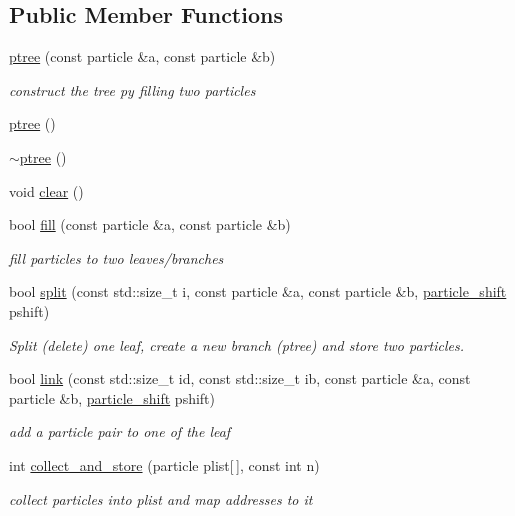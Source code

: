 \subsection*{Public Member Functions}
\begin{DoxyCompactItemize}
\item 
\hyperlink{classptree_a128cebcb837edbd16dd6dd9c7784ddd9}{ptree} (const particle \&a, const particle \&b)
\begin{DoxyCompactList}\small\item\em construct the tree py filling two particles \end{DoxyCompactList}\item 
\hyperlink{classptree_afcae2407c3b390bf0d7579951bd96961}{ptree} ()
\item 
\hyperlink{classptree_a7f4dd129764d06800dbadb91ed88a62c}{$\sim$ptree} ()
\item 
void \hyperlink{classptree_aa7b4caa59ef84eca62433a9621dcfb1b}{clear} ()
\item 
bool \hyperlink{classptree_a296d5895fbf14f2bb3af6ebf2fa52164}{fill} (const particle \&a, const particle \&b)
\begin{DoxyCompactList}\small\item\em fill particles to two leaves/branches \end{DoxyCompactList}\item 
bool \hyperlink{classptree_ae4c20eddf5cfcf45e5f809567c967bf9}{split} (const std\+::size\+\_\+t i, const particle \&a, const particle \&b, \hyperlink{classptree_abbd858cc881219618a3ac42f3df11cc6}{particle\+\_\+shift} pshift)
\begin{DoxyCompactList}\small\item\em Split (delete) one leaf, create a new branch (ptree) and store two particles. \end{DoxyCompactList}\item 
bool \hyperlink{classptree_a84643c9c87f4ed74ec06542e22c8bee7}{link} (const std\+::size\+\_\+t id, const std\+::size\+\_\+t ib, const particle \&a, const particle \&b, \hyperlink{classptree_abbd858cc881219618a3ac42f3df11cc6}{particle\+\_\+shift} pshift)
\begin{DoxyCompactList}\small\item\em add a particle pair to one of the leaf \end{DoxyCompactList}\item 
int \hyperlink{classptree_a0739f9513c8fe3fece542513b9ed48de}{collect\+\_\+and\+\_\+store} (particle plist\mbox{[}$\,$\mbox{]}, const int n)
\begin{DoxyCompactList}\small\item\em collect particles into plist and map addresses to it \end{DoxyCompactList}\item 

\end{DoxyCompactItemize}
